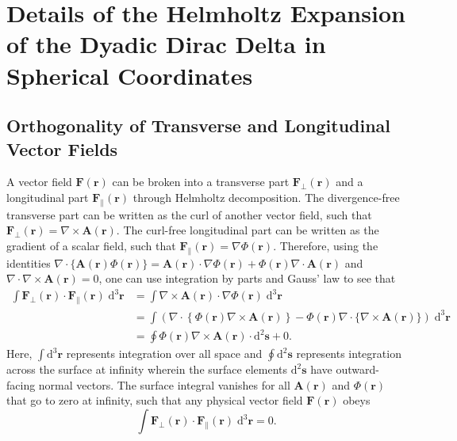 
\section{Details of the Helmholtz Expansion of the Dyadic Dirac Delta in Spherical Coordinates}

\subsection{Orthogonality of Transverse and Longitudinal Vector Fields}\label{sec:helmholtzOrthogonality}

A vector field $\mathbf{F}(\mathbf{r})$ can be broken into a transverse part $\mathbf{F}_\perp(\mathbf{r})$ and a longitudinal part $\mathbf{F}_\parallel(\mathbf{r})$ through Helmholtz decomposition. The divergence-free transverse part can be written as the curl of another vector field, such that $\mathbf{F}_\perp(\mathbf{r}) = \nabla\times\mathbf{A}(\mathbf{r})$. The curl-free longitudinal part can be written as the gradient of a scalar field, such that $\mathbf{F}_\parallel(\mathbf{r}) = \nabla\Phi(\mathbf{r})$. Therefore, using the identities $\nabla\cdot\{\mathbf{A}(\mathbf{r})\Phi(\mathbf{r})\} = \mathbf{A}(\mathbf{r})\cdot\nabla\Phi(\mathbf{r}) + \Phi(\mathbf{r})\nabla\cdot\mathbf{A}(\mathbf{r})$ and $\nabla\cdot\nabla\times\mathbf{A}(\mathbf{r}) = 0$, one can use integration by parts and Gauss' law to see that
\begin{equation}
\begin{split}
\int\mathbf{F}_\perp(\mathbf{r})\cdot\mathbf{F}_\parallel(\mathbf{r})\;\mathrm{d}^3\mathbf{r} &= \int\nabla\times\mathbf{A}(\mathbf{r})\cdot\nabla\Phi(\mathbf{r})\;\mathrm{d}^3\mathbf{r}\\
&=\int\left(\nabla\cdot\left\{\Phi(\mathbf{r})\nabla\times\mathbf{A}(\mathbf{r})\right\} - \Phi(\mathbf{r})\nabla\cdot\{\nabla\times\mathbf{A}(\mathbf{r})\}\right)\;\mathrm{d}^3\mathbf{r}\\
&= \oint\Phi(\mathbf{r})\nabla\times\mathbf{A}(\mathbf{r})\cdot\mathrm{d}^2\mathbf{s} + 0.
\end{split}
\end{equation}
Here, $\int\mathrm{d}^3\mathbf{r}$ represents integration over all space and $\oint\mathrm{d}^2\mathbf{s}$ represents integration across the surface at infinity wherein the surface elements $\mathrm{d}^2\mathbf{s}$ have outward-facing normal vectors. The surface integral vanishes for all $\mathbf{A}(\mathbf{r})$ and $\Phi(\mathbf{r})$ that go to zero at infinity, such that any physical vector field $\mathbf{F}(\mathbf{r})$ obeys
\begin{equation}\label{eq:helmholtzOrthogonality}
\int\mathbf{F}_\perp(\mathbf{r})\cdot\mathbf{F}_\parallel(\mathbf{r})\;\mathrm{d}^3\mathbf{r} = 0.
\end{equation}







